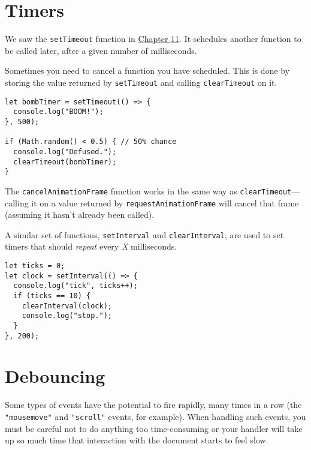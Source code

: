 \section{Timers}

We saw the \lstinline`setTimeout` function in \hyperref[async]{Chapter 11}. It schedules another function to be called later, after a given number of milliseconds.

Sometimes you need to cancel a function you have scheduled. This is done by storing the value returned by \lstinline`setTimeout` and calling \lstinline`clearTimeout` on it.

\begin{lstlisting}
let bombTimer = setTimeout(() => {
  console.log("BOOM!");
}, 500);

if (Math.random() < 0.5) { // 50% chance
  console.log("Defused.");
  clearTimeout(bombTimer);
}
\end{lstlisting}
\noindent{}

The \lstinline`cancelAnimationFrame` function works in the same way as \lstinline`clearTimeout`—calling it on a value returned by \lstinline`requestAnimationFrame` will cancel that frame (assuming it hasn't already been called).

A similar set of functions, \lstinline`setInterval` and \lstinline`clearInterval`, are used to set timers that should \emph{repeat} every \emph{X} milliseconds.

\begin{lstlisting}
let ticks = 0;
let clock = setInterval(() => {
  console.log("tick", ticks++);
  if (ticks == 10) {
    clearInterval(clock);
    console.log("stop.");
  }
}, 200);
\end{lstlisting}
\noindent

\section{Debouncing}

Some types of events have the potential to fire rapidly, many times in a row (the \lstinline`"mousemove"` and \lstinline`"scroll"` events, for example). When handling such events, you must be careful not to do anything too time-consuming or your handler will take up so much time that interaction with the document starts to feel slow.

